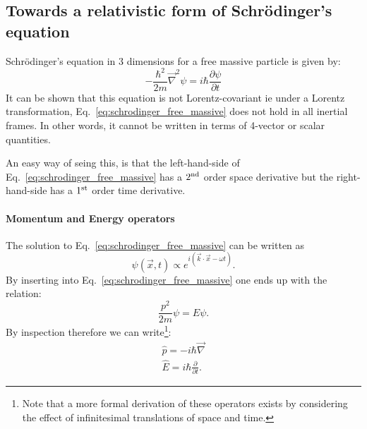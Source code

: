 \subsection{Towards a relativistic form of Schr\"odinger's equation}

Schr\"odinger's equation in 3 dimensions for a free massive particle is given by:
\begin{equation}
\label{eq:schrodinger_free_massive}
-\frac{\hbar^2}{2m}\vec{\nabla}^2\psi=i\hbar\frac{\partial\psi}{\partial t}
\end{equation}
It can be shown that this equation is not Lorentz-covariant ie under a Lorentz transformation, Eq.~\ref{eq:schrodinger_free_massive} does not hold in all inertial frames. In other words, it cannot be written in terms of 4-vector or scalar quantities.

An easy way of seing this, is that the left-hand-side of Eq.~\ref{eq:schrodinger_free_massive} has a $2^{\rm nd}$ order space derivative but the right-hand-side has a $1^{\rm st}$ order time derivative.

\paragraph{Momentum and Energy operators}
The solution to Eq.~\ref{eq:schrodinger_free_massive} can be written as
\[
\psi(\vec{x},t)\propto e^{i(\vec{k}\cdot\vec{x}-\omega t)}.
\]
By inserting into Eq.~\ref{eq:schrodinger_free_massive} one ends up with the relation:
\[
\frac{p^2}{2m}\psi=E\psi.
\]
By inspection therefore we can write\footnote{Note that a more formal derivation of these operators exists by considering the effect of infinitesimal translations of space and time.}:
\begin{eqnarray}
\label{eq:mom_operator}
\hat{p}=-i\hbar\vec{\nabla}\\
\hat{E}=i\hbar\frac{\partial}{\partial t}.
\end{eqnarray}

